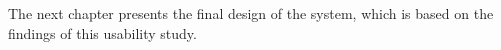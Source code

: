 The next chapter presents the final design of the system, which is based on the findings of this usability study.







